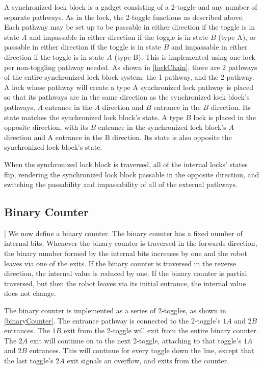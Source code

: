 \documentclass[11pt]{article}
\makeatletter
\gdef\xxx{\@ifnextchar[\xxx@lab\xxx@nolab}
\makeatother
\begin{document}
A synchronized lock block is a gadget consisting of a 2-toggle and any number of separate pathways. As in the
lock, the 2-toggle functions as described above. Each pathway may be set up to be passable in either direction
if the toggle is in state $A$ and impassable in either direction if the toggle is in state $B$ (type A), or
passable in either direction if the toggle is in state $B$ and impassable in either direction if the
toggle is in state $A$ (type B). This is
implemented using one lock per non-toggling pathway needed. As shown in \ref{lockChain}, there are 2
pathways of the entire synchronized lock block system: the 1 pathway, and the 2 pathway. A lock whose pathway will create
a type A synchronized lock pathway is placed so that its pathways are in the same direction as the synchronized lock block's
pathways, $A$ entrance in the $A$ direction and $B$ entrance in the $B$ direction. Its state matches the 
synchronized lock block's
state.
A type $B$ lock is placed in the opposite direction, with its $B$ entrance in the synchronized lock block's $A$ direction and
A entrance in the B direction. Its state is also opposite the synchronized lock block's state.

When the synchronized lock block is traversed, all of the internal locks' states flip, rendering the synchronized lock block passable in
the opposite direction, and switching the passability and impassability of all of the external pathways.

\subsection{Binary Counter}
\xxx{binary counter figure}
We now define a binary counter. The binary counter has a fixed number of internal bits.
Whenever the binary counter is traversed in the forwards direction, the binary number
formed by the internal bits increases by one and the robot leaves via one of the exits.
If the binary counter is traversed in the reverse direction, the internal value is reduced by
one. If the binary counter is partial traversed, but then the robot leaves via its initial entrance,
the internal value does not change.

The binary counter is implemented as a series of 2-toggles, as shown in \ref{binaryCounter}.
The entrance pathway is connected to the 2-toggle's $1A$ and $2B$ entrances. The $1B$ exit from the 2-toggle
will exit from the entire binary counter. The $2A$ exit will continue on to the next 2-toggle,
attaching to that toggle's $1A$ and $2B$ entrances. This will continue for every toggle down the line, except
that the last toggle's $2A$ exit signals an overflow, and exits from the counter.
\end{document}
